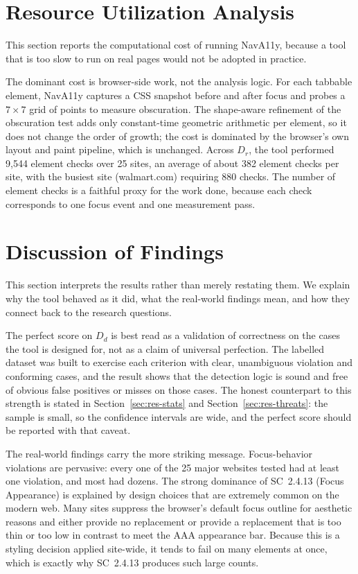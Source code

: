 \section{Resource Utilization Analysis}
\label{sec:res-resource}

This section reports the computational cost of running NavA11y, because a tool that is too
slow to run on real pages would not be adopted in practice.

The dominant cost is browser-side work, not the analysis logic. For each tabbable element,
NavA11y captures a CSS snapshot before and after focus and probes a $7\times7$ grid of
points to measure obscuration. The shape-aware refinement of the obscuration test adds only
constant-time geometric arithmetic per element, so it does not change the order of growth;
the cost is dominated by the browser's own layout and paint pipeline, which is unchanged.
Across $D_r$, the tool performed 9{,}544 element checks over 25 sites, an average of about
382 element checks per site, with the busiest site (walmart.com) requiring 880 checks. The
number of element checks is a faithful proxy for the work done, because each check
corresponds to one focus event and one measurement pass.

\section{Discussion of Findings}
\label{sec:res-discussion}

This section interprets the results rather than merely restating them. We explain why the
tool behaved as it did, what the real-world findings mean, and how they connect back to the
research questions.

The perfect score on $D_d$ is best read as a validation of correctness on the cases the tool
is designed for, not as a claim of universal perfection. The labelled dataset was built to
exercise each criterion with clear, unambiguous violation and conforming cases, and the
result shows that the detection logic is sound and free of obvious false positives or misses
on those cases. The honest counterpart to this strength is stated in
Section~\ref{sec:res-stats} and Section~\ref{sec:res-threats}: the sample is small, so the
confidence intervals are wide, and the perfect score should be reported with that caveat.

The real-world findings carry the more striking message. Focus-behavior violations are
pervasive: every one of the 25 major websites tested had at least one violation, and most
had dozens. The strong dominance of SC~2.4.13 (Focus Appearance) is explained by design
choices that are extremely common on the modern web. Many sites suppress the browser's
default focus outline for aesthetic reasons and either provide no replacement or provide a
replacement that is too thin or too low in contrast to meet the AAA appearance bar. Because
this is a styling decision applied site-wide, it tends to fail on many elements at once,
which is exactly why SC~2.4.13 produces such large counts.

